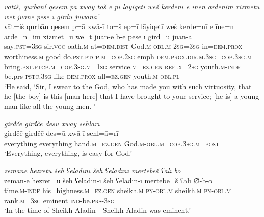 \ea \label{ZQ.54}
\textit{vātiš, qurbān! qesem pā xwāy toš e pī lāyiqetī weš kerdenī e īnen ārdenim xizmetū wēt juānē pēse ī girdū juwānā’} \\ 
\gll vāt=iš qurbān qesem p=ā xwā-ī to=š ep=ī lāyiqetī weš kerde=nī e īne=n ārde=n=im xizmet=ū wē=t juān-ē b-ē pēse ī gird=ū juān-ā \\ 
 say\textsc{.pst}\textsc{=3sg} sir.\textsc{voc} oath\textsc{.m} at=\textsc{dem.dist} God\textsc{.m}\textsc{-obl}\textsc{.m} \textsc{2sg}\textsc{=3sg} in=\textsc{dem.prox} worthiness\textsc{.m} good do\textsc{.pst}\textsc{.ptcp}\textsc{.m}\textsc{=cop}\textsc{.\textsc{2sg}} emph \textsc{dem.prox}\textsc{.dir}\textsc{.m}\textsc{.3sg}\textsc{=cop}\textsc{.3sg}\textsc{.m} bring\textsc{.pst}\textsc{.ptcp}\textsc{.m}\textsc{=cop}\textsc{.3sg}\textsc{.m}\textsc{=\textsc{1sg}} service\textsc{.m}\textsc{=ez.gen} \textsc{reflx}\textsc{=\textsc{2sg}} youth\textsc{.m}\textsc{-indf} be.prs\textsc{-pstc}\textsc{.3sg} like \textsc{dem.prox} all\textsc{=ez.gen} youth\textsc{.m}\textsc{-obl}\textsc{.pl} \\ 
\glt `He said, ‘Sir, I swear to the God, who has made you with such virtuosity, that he [the boy] is this [man here] that I have brought to your service; [he is] a young man like all the young men. '
\z 
 
\ea \label{ZQ.56}
\textit{girđčē girđčē desū xwāy sehlārī} \\ 
\gll girđčē girđčē des=ū xwā-ī sehl=ā=rī \\ 
 everything everything hand\textsc{.m}\textsc{=ez.gen} God\textsc{.m}\textsc{-obl}\textsc{.m}\textsc{=cop}\textsc{.3sg}\textsc{.m}\textsc{=\textsc{post}} \\ 
\glt `Everything, everything, is easy for God.'
\z 
 

\ea \label{HB.1}
\textit{zemānē hezretū šēh ʕelādīnī šēh ʕelādīnī mertebeš ʕālī bo} \\ 
\gll zemān-ē hezret=ū šēh ʕelādīn-ī šēh ʕelādīn-ī mertebe=š ʕālī ∅-b-o \\ 
 time\textsc{.m}\textsc{-indf} his\_highness\textsc{.m}\textsc{=ez}\textsc{.gen} sheikh\textsc{.m} \textsc{pn}\textsc{-obl}\textsc{.m} sheikh\textsc{.m} \textsc{pn}\textsc{-obl}\textsc{.m} rank\textsc{.m}\textsc{=3sg} eminent \textsc{ind-}be\textsc{.prs}\textsc{-3sg} \\ 
\glt `In the time of Sheikh Aladin—Sheikh Aladin was eminent.'
\z 
 
